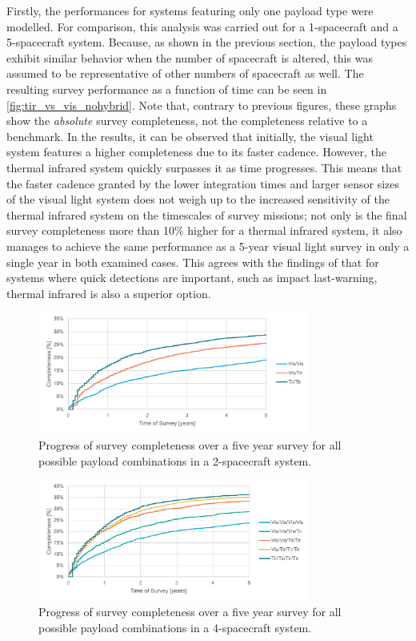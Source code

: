 Firstly, the performances for systems featuring only one payload type were modelled. For comparison, this analysis was carried out for a 1-spacecraft and a 5-spacecraft system. Because, as shown in the previous section, the payload types exhibit similar behavior when the number of spacecraft is altered, this was assumed to be representative of other numbers of spacecraft as well. The resulting survey performance as a function of time can be seen in \autoref{fig:tir_vs_vis_nohybrid}. Note that, contrary to previous figures, these graphs show the \textit{absolute} survey completeness, not the completeness relative to a benchmark. In the results, it can be observed that initially, the visual light system features a higher completeness due to its faster cadence. However, the thermal infrared system quickly surpasses it as time progresses. This means that the faster cadence granted by the lower integration times and larger sensor sizes of the visual light system does not weigh up to the increased sensitivity of the thermal infrared system on the timescales of survey missions; not only is the final survey completeness more than 10\% higher for a thermal infrared system, it also manages to achieve the same performance as a 5-year visual light survey in only a single year in both examined cases. This agrees with the findings of \cite{ThesisOlga} that for systems where quick detections are important, such as impact last-warning, thermal infrared is also a superior option. \\

\begin{figure}[htbp]
 \centering
 \includegraphics[width=0.8\textwidth]{img/tir_vs_vis_2_hybrid.pdf}
 \caption{Progress of survey completeness over a five year survey for all possible payload combinations in a 2-spacecraft system.}
 \label{fig:payload_hybrid_one}
\end{figure}

\begin{figure}[htbp]
 \centering
 \includegraphics[width=0.8\textwidth]{img/tir_vs_vis_4_hybrid.pdf}
 \caption{Progress of survey completeness over a five year survey for all possible payload combinations in a 4-spacecraft system.}
 \label{fig:payload_hybrid_two}
\end{figure}

